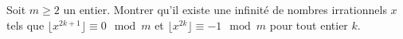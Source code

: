 Soit $m\ge 2$ un entier. Montrer qu'il existe une infinité de nombres irrationnels $x$ tels que $\lfloor x^{2k+1}\rfloor \equiv 0 \mod m$ et $\lfloor x^{2k} \rfloor \equiv -1 \mod m$ pour tout entier $k$.